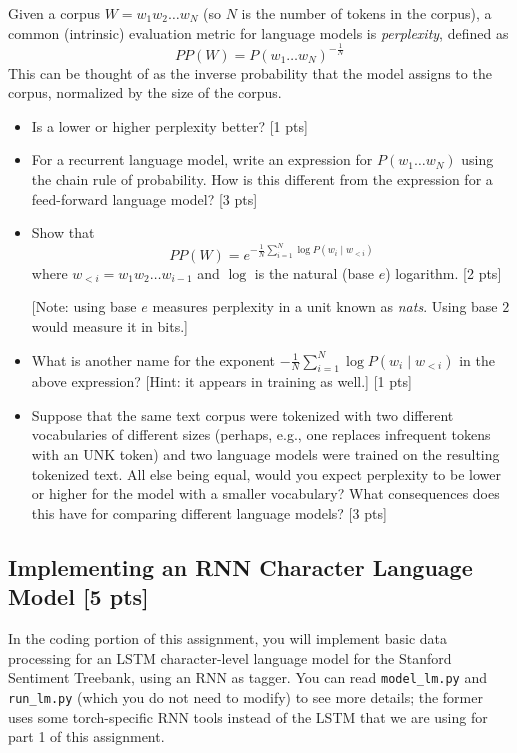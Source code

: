 \documentclass[11pt]{article}
\begin{document}
 Given a corpus $W = w_1 w_2 \dots w_N$ (so $N$ is the number of tokens in the corpus), a common (intrinsic) evaluation metric for language models is \emph{perplexity}, defined as
\[ PP(W) = P(w_1 \dots w_N)^{-\frac{1}{N}} \]
This can be thought of as the inverse probability that the model assigns to the corpus, normalized by the size of the corpus.
\begin{itemize}
  \item Is a lower or higher perplexity better? \hfill [1 pts]
  \item For a recurrent language model, write an expression for $P(w_1 \dots w_N)$ using the chain rule of probability.  How is this different from the expression for a feed-forward language model? \hfill [3 pts]
  \item Show that
  \[ PP(W) = e^{-\frac{1}{N} \sum_{i=1}^N \log P(w_i \mid w_{<i})} \]
  where $w_{<i} = w_1 w_2 \dots w_{i-1}$ and $\log$ is the natural (base $e$) logarithm. \hfill [2 pts]
  
  [Note: using base $e$ measures perplexity in a unit known as \emph{nats}.  Using base $2$ would measure it in bits.]

  \item What is another name for the exponent $-\frac{1}{N} \sum_{i=1}^N \log P(w_i \mid w_{<i})$ in the above expression? [Hint: it appears in training as well.] \hfill [1 pts]
  \item Suppose that the same text corpus were tokenized with two different vocabularies of different sizes (perhaps, e.g., one replaces infrequent tokens with an UNK token) and two language models were trained on the resulting tokenized text.  All else being equal, would you expect perplexity to be lower or higher for the model with a smaller vocabulary?  What consequences does this have for comparing different language models? [3 pts]
\end{itemize}

\subsection{Implementing an RNN Character Language Model [5 pts]}

In the coding portion of this assignment, you will implement basic data processing for an LSTM character-level language model for the Stanford Sentiment Treebank, using an RNN as tagger.  You can read \texttt{model\_lm.py} and \texttt{run\_lm.py} (which you do not need to modify) to see more details; the former uses some torch-specific RNN tools instead of the LSTM that we are using for part 1 of this assignment.
\end{document}
